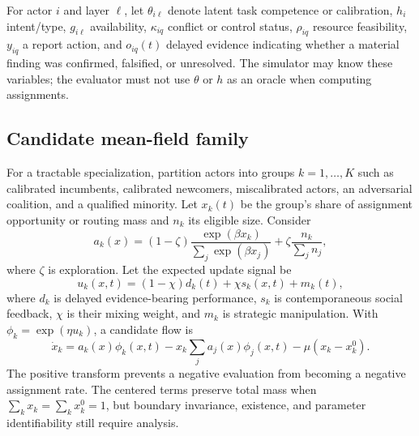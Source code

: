\documentclass[11pt]{article}
\begin{document}
For actor $i$ and layer $\ell$, let $\theta_{i\ell}$ denote latent task competence or calibration, $h_i$ intent/type, $g_{i\ell}$ availability, $\kappa_{iq}$ conflict or control status, $\rho_{iq}$ resource feasibility, $y_{iq}$ a report action, and $o_{iq}(t)$ delayed evidence indicating whether a material finding was confirmed, falsified, or unresolved.  The simulator may know these variables; the evaluator must not use $\theta$ or $h$ as an oracle when computing assignments.

\subsection{Candidate mean-field family}

For a tractable specialization, partition actors into groups $k=1,\ldots,K$ such as calibrated incumbents, calibrated newcomers, miscalibrated actors, an adversarial coalition, and a qualified minority.  Let $x_k(t)$ be the group's share of assignment opportunity or routing mass and $n_k$ its eligible size.  Consider
\begin{equation}
 a_k(x)=(1-\zeta)\frac{\exp(\beta x_k)}{\sum_j\exp(\beta x_j)}
   +\zeta\frac{n_k}{\sum_j n_j},
 \label{eq:explore}
\end{equation}
where $\zeta$ is exploration.  Let the expected update signal be
\begin{equation}
 u_k(x,t)=(1-\chi)d_k(t)+\chi s_k(x,t)+m_k(t),
\end{equation}
where $d_k$ is delayed evidence-bearing performance, $s_k$ is contemporaneous social feedback, $\chi$ is their mixing weight, and $m_k$ is strategic manipulation.  With $\phi_k=\exp(\eta u_k)$, a candidate flow is
\begin{equation}
 \dot x_k=a_k(x)\phi_k(x,t)
 -x_k\sum_j a_j(x)\phi_j(x,t)-\mu(x_k-x^0_k).
 \label{eq:meanfield}
\end{equation}
The positive transform prevents a negative evaluation from becoming a negative assignment rate.  The centered terms preserve total mass when $\sum_kx_k=\sum_kx^0_k=1$, but boundary invariance, existence, and parameter identifiability still require analysis.

\end{document}
